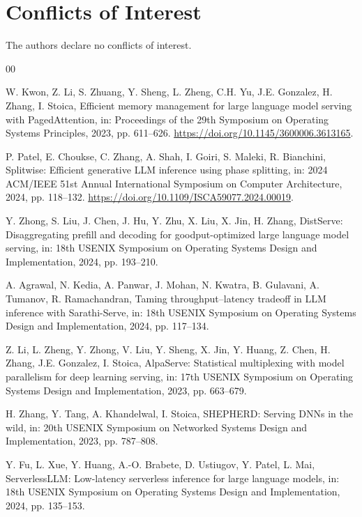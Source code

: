 \documentclass[preprint,12pt]{elsarticle}
\begin{document}
\section*{Conflicts of Interest}
The authors declare no conflicts of interest.

\begin{thebibliography}{00}

W. Kwon, Z. Li, S. Zhuang, Y. Sheng, L. Zheng, C.H. Yu, J.E. Gonzalez, H. Zhang, I. Stoica,
Efficient memory management for large language model serving with PagedAttention,
in: Proceedings of the 29th Symposium on Operating Systems Principles, 2023, pp. 611--626.
\newblock \url{https://doi.org/10.1145/3600006.3613165}.

P. Patel, E. Choukse, C. Zhang, A. Shah, I. Goiri, S. Maleki, R. Bianchini,
Splitwise: Efficient generative LLM inference using phase splitting,
in: 2024 ACM/IEEE 51st Annual International Symposium on Computer Architecture, 2024, pp. 118--132.
\newblock \url{https://doi.org/10.1109/ISCA59077.2024.00019}.

Y. Zhong, S. Liu, J. Chen, J. Hu, Y. Zhu, X. Liu, X. Jin, H. Zhang,
DistServe: Disaggregating prefill and decoding for goodput-optimized large language model serving,
in: 18th USENIX Symposium on Operating Systems Design and Implementation, 2024, pp. 193--210.

A. Agrawal, N. Kedia, A. Panwar, J. Mohan, N. Kwatra, B. Gulavani, A. Tumanov, R. Ramachandran,
Taming throughput--latency tradeoff in LLM inference with Sarathi-Serve,
in: 18th USENIX Symposium on Operating Systems Design and Implementation, 2024, pp. 117--134.

Z. Li, L. Zheng, Y. Zhong, V. Liu, Y. Sheng, X. Jin, Y. Huang, Z. Chen, H. Zhang, J.E. Gonzalez, I. Stoica,
AlpaServe: Statistical multiplexing with model parallelism for deep learning serving,
in: 17th USENIX Symposium on Operating Systems Design and Implementation, 2023, pp. 663--679.

H. Zhang, Y. Tang, A. Khandelwal, I. Stoica,
SHEPHERD: Serving DNNs in the wild,
in: 20th USENIX Symposium on Networked Systems Design and Implementation, 2023, pp. 787--808.

Y. Fu, L. Xue, Y. Huang, A.-O. Brabete, D. Ustiugov, Y. Patel, L. Mai,
ServerlessLLM: Low-latency serverless inference for large language models,
in: 18th USENIX Symposium on Operating Systems Design and Implementation, 2024, pp. 135--153.


\end{thebibliography}
\end{document}
